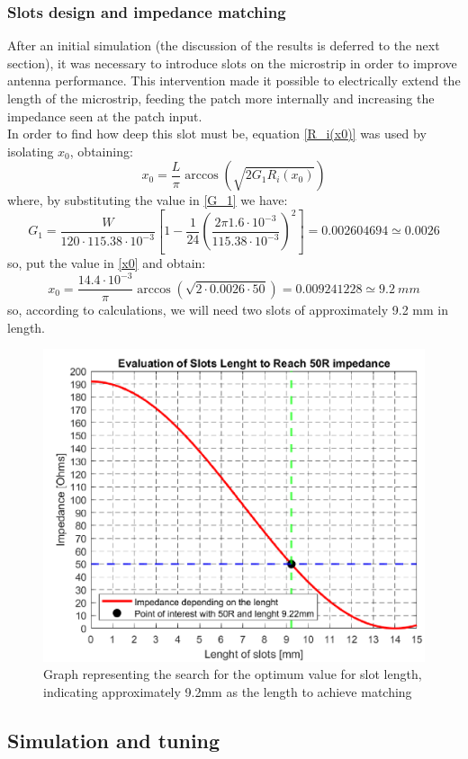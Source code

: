 \documentclass[]{article}
\begin{document}
 \subsubsection{Slots design and impedance matching}
 After an initial simulation (the discussion of the results is deferred to the next section), it was necessary to introduce slots on the microstrip in order to improve antenna performance. This intervention made it possible to electrically extend the length of the microstrip, feeding the patch more internally and increasing the impedance seen at the patch input.\\
 In order to find how deep this slot must be, equation \eqref{R_i(x0)} was used by isolating $x_0$, obtaining: 
 \begin{equation}
 	x_0 = \frac{L}{\pi} \arccos\left(\sqrt{2G_1 R_i(x_0)}\right)
 	\label{x0}
 \end{equation}
 where, by substituting the value in \eqref{G_1} we have:
 \[
 G_1=\frac{W}{120 \cdot 115.38 \cdot 10^{-3}
  }\left[ 1-\frac{1}{24}(\frac{2 \pi 1.6\cdot 10^{-3}}{ 115.38 \cdot 10^{-3}})^2\right] = 0.002604694 \simeq 0.0026  
 \]
 so, put the value in \eqref{x0} and obtain: 
 \[
 x_0 = \frac{14.4 \cdot 10^{-3}}{\pi} \arccos\left(\sqrt{2 \cdot 0.0026 \cdot  50}\right) =  0.009241228 \simeq 9.2 \ mm
 \]
so, according to calculations, we will need two slots of approximately 9.2 mm in length.
\begin{figure}[h]
	\centering
	\includegraphics[width=0.42\linewidth]{img/img9}
	\caption{Graph representing the search for the optimum value for slot length, indicating approximately 9.2mm as the length to achieve matching}
	\label{fig:img9}
\end{figure}

\newpage

\subsection{Simulation and tuning}
\end{document}
